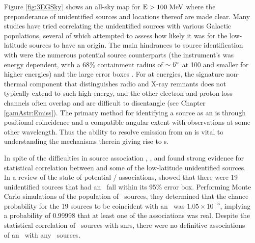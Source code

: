  
 Figure \ref{fig:3EGSky} shows an \egret{} all-sky map for ${\rm E > 100 ~\mathrm{MeV}}$ where the preponderance of unidentified sources and locations thereof are made clear. Many studies have tried correlating the unidentified \egret{} sources with various Galactic populations, several of which attempted to assess how likely it was for the low-latitude sources to have an \snr{} origin. The main hindrances to source identification with \egret{} were the numerous potential source counterparts (the instrument's \psf{} was energy dependent, with a 68\% containment radius of ${\rm \sim 6 ^\circ}$ at 100\mev{} and smaller for higher energies) and the large \egret{} error boxes \citep{Hartman99}. For \snrs{} at \gam{} energies, the signature non-thermal \sync{} component that distinguishes radio and X-ray remnants does not typically extend to such high energy, and the other electron and proton loss channels often overlap and are difficult to disentangle (see Chapter \ref{gamAstr:Emiss}). The primary method for identifying a \gam{} source as an \snr{} is through positional coincidence and a compatible angular extent with observations at some other wavelength. Thus the ability to resolve emission from an \snr{} is vital to understanding the mechanisms therein giving rise to \gam{}s.

In spite of the difficulties in \egret{} source association \cite{Sturner95}, \cite{Esposito96}, and \cite{Romero99} found strong evidence for statistical correlation between \snrs{} and some of the low-latitude unidentified sources. In a review of the state of potential \snr{} /  \egret{} associations, \cite{Torres03} showed that there were 19 unidentified \egret{} sources that had an \snr~fall within its 95\% error box. Performing Monte Carlo simulations of the population of  \egret~sources, they determined that the chance probability for the 19 sources to be coincident with an \snr~was $1.05 \times 10^{-5}$, implying a probability of 0.99998 that at least one of the associations was real. Despite the statistical correlation of \egret~sources with \glspl{snr}, there were no definitive associations of an \snr~with any \egret~sources.

